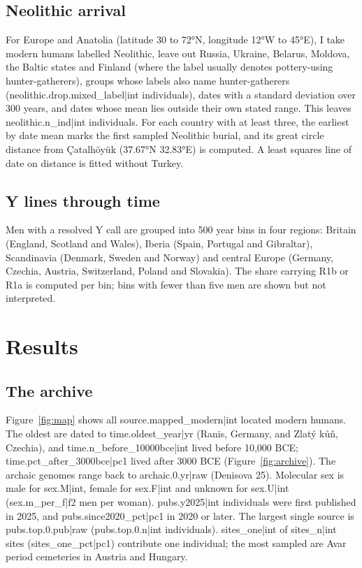 \documentclass[11pt,a4paper]{article}
\begin{document}
\subsection{Neolithic arrival}
For Europe and Anatolia (latitude 30 to 72°N, longitude 12°W to 45°E), I take modern humans labelled Neolithic, leave out Russia, Ukraine, Belarus, Moldova, the Baltic states and Finland (where the label usually denotes pottery-using hunter-gatherers), groups whose labels also name hunter-gatherers ({{neolithic.drop.mixed_label|int}} individuals), dates with a standard deviation over 300 years, and dates whose mean lies outside their own stated range. This leaves {{neolithic.n_ind|int}} individuals. For each country with at least three, the earliest by date mean marks the first sampled Neolithic burial, and its great circle distance from Çatalhöyük (37.67°N 32.83°E) is computed. A least squares line of date on distance is fitted without Turkey.

\subsection{Y lines through time}
Men with a resolved Y call are grouped into 500 year bins in four regions: Britain (England, Scotland and Wales), Iberia (Spain, Portugal and Gibraltar), Scandinavia (Denmark, Sweden and Norway) and central Europe (Germany, Czechia, Austria, Switzerland, Poland and Slovakia). The share carrying R1b or R1a is computed per bin; bins with fewer than five men are shown but not interpreted.

\section{Results}
\subsection{The archive}
Figure~\ref{fig:map} shows all {{source.mapped_modern|int}} located modern humans. The oldest are dated to {{time.oldest_year|yr}} (Ranis, Germany, and Zlatý kůň, Czechia), and {{time.n_before_10000bce|int}} lived before 10,000 BCE; {{time.pct_after_3000bce|pc1}} lived after 3000 BCE (Figure~\ref{fig:archive}). The archaic genomes range back to {{archaic.0.yr|raw}} (Denisova 25). Molecular sex is male for {{sex.M|int}}, female for {{sex.F|int}} and unknown for {{sex.U|int}} ({{sex.m_per_f|f2}} men per woman). {{pubs.y2025|int}} individuals were first published in 2025, and {{pubs.since2020_pct|pc1}} in 2020 or later. The largest single source is {{pubs.top.0.pub|raw}} ({{pubs.top.0.n|int}} individuals). {{sites_one|int}} of {{sites_n|int}} sites ({{sites_one_pct|pc1}}) contribute one individual; the most sampled are Avar period cemeteries in Austria and Hungary.
\end{document}
